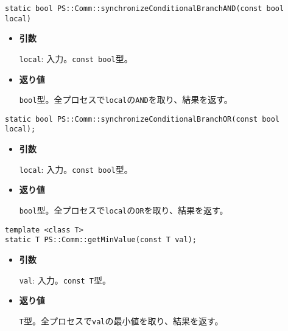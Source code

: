 
\begin{screen}
\begin{verbatim}
static bool PS::Comm::synchronizeConditionalBranchAND(const bool local)
\end{verbatim}
\end{screen}

\begin{itemize}

\item{{\bf 引数}}

{\tt local}: 入力。{\tt const bool}型。

\item{{\bf 返り値}}

{\tt bool}型。全プロセスで{\tt local}の{\tt AND}を取り、結果を返す。

\end{itemize}


\begin{screen}
\begin{verbatim}
static bool PS::Comm::synchronizeConditionalBranchOR(const bool local);
\end{verbatim}
\end{screen}

\begin{itemize}

\item{{\bf 引数}}

{\tt local}: 入力。{\tt const bool}型。

\item{{\bf 返り値}}

{\tt bool}型。全プロセスで{\tt local}の{\tt OR}を取り、結果を返す。

\end{itemize}


\begin{screen}
\begin{verbatim}
template <class T>
static T PS::Comm::getMinValue(const T val);
\end{verbatim}
\end{screen}

\begin{itemize}

\item{{\bf 引数}}

{\tt val}: 入力。{\tt const T}型。

\item{{\bf 返り値}}

{\tt T}型。全プロセスで{\tt val}の最小値を取り、結果を返す。

\end{itemize}

